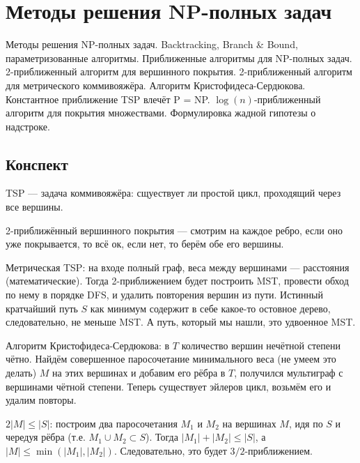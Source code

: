 \section{Методы решения NP-полных задач}
Методы решения NP-полных задач.
Backtracking, Branch \& Bound, параметризованные алгоритмы.
Приближенные алгоритмы для NP-полных задач.
2-приближенный алгоритм для вершинного покрытия.
2-приближенный алгоритм для метрического коммивояжёра.
Алгоритм Кристофидеса-Сердюкова.
Константное приближение TSP влечёт P = NP.
$\log(n)$-приближенный алгоритм для покрытия множествами.
Формулировка жадной гипотезы о надстроке.

\subsection{Конспект}
TSP --- задача коммивояжёра:
сщуествует ли простой цикл,
проходящий через все вершины.

\bigskip

2-приближённый вершинного покрытия
--- смотрим на каждое ребро, если оно уже покрывается,
то всё ок, если нет, то берём обе его вершины.

\bigskip

Метрическая TSP: на входе полный граф,
веса между вершинами --- расстояния (математические).
Тогда 2-приближением будет построить MST,
провести обход по нему в порядке DFS,
и удалить повторения вершин из пути.
Истинный кратчайший путь $S$
как минимум содержит в себе какое-то
остовное дерево, следовательно,
не меньше MST.
А путь, который мы нашли, это удвоенное MST.

\bigskip

Алгоритм Кристофидеса-Сердюкова:
в $T$ количество вершин нечётной степени чётно.
Найдём совершенное паросочетание
минимального веса (не умеем это делать) $M$
на этих вершинах
и добавим его рёбра в $T$,
получился мультиграф с вершинами чётной степени.
Теперь существует эйлеров цикл,
возьмём его и удалим повторы.

$2 |M| \le |S|$:
построим два паросочетания $M_1$ и $M_2$ на вершинах $M$,
идя по $S$ и чередуя рёбра (т.е. $M_1 \cup M_2 \subset S$).
Тогда $|M_1| + |M_2| \le |S|$,
а $|M| \le \min(|M_1|, |M_2|)$.
Следовательно, это будет $3/2$-приближением.
